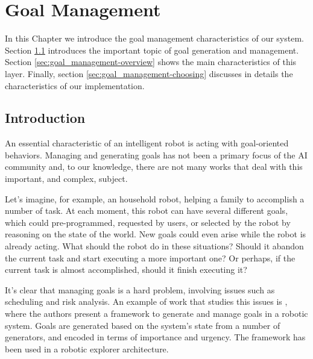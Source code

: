 
\chapter{Goal Management} %

\label{chapter-goal_management} %

In this Chapter we introduce the goal management characteristics of our system. Section \ref{sec:goal_management-intro} introduces the important topic of goal generation and management. Section \ref{sec:goal_management-overview} shows the main characteristics of this layer. Finally, section \ref{sec:goal_management-choosing} discusses in details the characteristics of our implementation.

\section{Introduction}
\label{sec:goal_management-intro}
An essential characteristic of an intelligent robot is acting with goal-oriented behaviors. Managing and generating goals has not been a primary focus of the AI community and, to our knowledge, there are not many works that deal with this important, and complex, subject. 

Let's imagine, for example, an household robot, helping a family to accomplish a number of task. At each moment, this robot can have several different goals, which could pre-programmed, requested by users, or selected by the robot by reasoning on the state of the world. New goals could even arise while the robot is already acting. What should the robot do in these situations? Should it abandon the current task and start executing a more important one? Or perhaps, if the current task is almost accomplished, should it finish executing it?  

It's clear that managing goals is a hard problem, involving issues such as scheduling and risk analysis. An example of work that studies this issues is \cite{hanheide2010framework}, where the authors present a framework to generate and manage goals in a robotic system. Goals are generated based on the system's state from a number of generators, and encoded in terms of importance and urgency. The framework has been used in a robotic explorer architecture.

